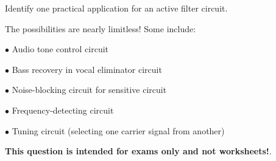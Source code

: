 

Identify one practical application for an active filter circuit.







The possibilities are nearly limitless!  Some include:

\medskip
\item{$\bullet$} Audio tone control circuit
\item{$\bullet$} Bass recovery in vocal eliminator circuit
\item{$\bullet$} Noise-blocking circuit for sensitive circuit
\item{$\bullet$} Frequency-detecting circuit
\item{$\bullet$} Tuning circuit (selecting one carrier signal from another)
\medskip







{\bf This question is intended for exams only and not worksheets!}.



